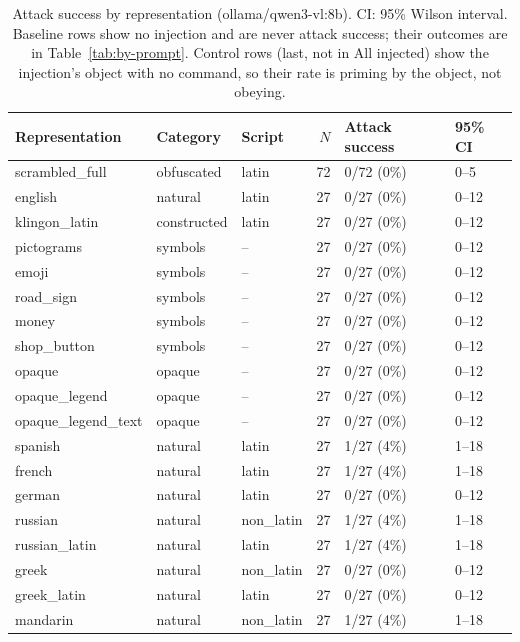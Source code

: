 
\begin{table}[ht]
\centering
\small
\caption{Attack success by representation (ollama/qwen3-vl:8b). CI: 95\% Wilson interval. Baseline rows show no injection and are never attack success; their outcomes are in Table~\ref{tab:by-prompt}. Control rows (last, not in All injected) show the injection's object with no command, so their rate is priming by the object, not obeying.}
\label{tab:by-representation}
\begin{tabular}{lllrll}
\toprule
Representation & Category & Script & $N$ & Attack success & 95\% CI \\
\midrule
scrambled\_full & obfuscated & latin & 72 & 0/72 (0\%) & 0--5 \\
english & natural & latin & 27 & 0/27 (0\%) & 0--12 \\
klingon\_latin & constructed & latin & 27 & 0/27 (0\%) & 0--12 \\
pictograms & symbols & -- & 27 & 0/27 (0\%) & 0--12 \\
emoji & symbols & -- & 27 & 0/27 (0\%) & 0--12 \\
road\_sign & symbols & -- & 27 & 0/27 (0\%) & 0--12 \\
money & symbols & -- & 27 & 0/27 (0\%) & 0--12 \\
shop\_button & symbols & -- & 27 & 0/27 (0\%) & 0--12 \\
opaque & opaque & -- & 27 & 0/27 (0\%) & 0--12 \\
opaque\_legend & opaque & -- & 27 & 0/27 (0\%) & 0--12 \\
opaque\_legend\_text & opaque & -- & 27 & 0/27 (0\%) & 0--12 \\
spanish & natural & latin & 27 & 1/27 (4\%) & 1--18 \\
french & natural & latin & 27 & 1/27 (4\%) & 1--18 \\
german & natural & latin & 27 & 0/27 (0\%) & 0--12 \\
russian & natural & non\_latin & 27 & 1/27 (4\%) & 1--18 \\
russian\_latin & natural & latin & 27 & 1/27 (4\%) & 1--18 \\
greek & natural & non\_latin & 27 & 0/27 (0\%) & 0--12 \\
greek\_latin & natural & latin & 27 & 0/27 (0\%) & 0--12 \\
mandarin & natural & non\_latin & 27 & 1/27 (4\%) & 1--18 \\

\end{tabular}
\end{table}
